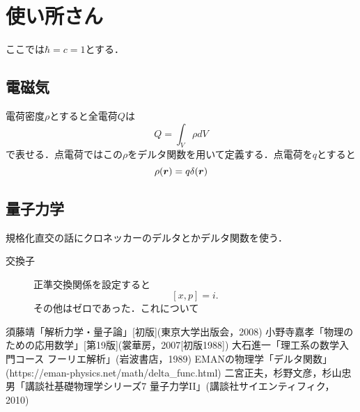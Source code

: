 \documentclass{jsarticle}
\def\vector#1{\mbox{\boldmath $#1$}}
\def\kkakko#1{\left[ #1 \right] }
\begin{document}
\section{使い所さん}
ここでは$\hbar=c=1$とする．
\subsection{電磁気}
電荷密度$\rho$とすると全電荷$Q$は
\begin{equation}
Q=\int_{V} \rho dV
\end{equation}
で表せる．点電荷ではこの$\rho$をデルタ関数を用いて定義する．点電荷を$q$とすると
\begin{equation}
\rho(\vector{r})=q\delta(\vector{r})
\end{equation}
\subsection{量子力学}
規格化直交の話にクロネッカーのデルタとかデルタ関数を使う．
\begin{description}
\item[交換子] 正準交換関係を設定すると
\begin{equation}
\kkakko{x,p}=i.
\end{equation}
その他はゼロであった．これについて
\end{description}
\begin{thebibliography}{99}
 須藤靖「解析力学・量子論」[初版](東京大学出版会，2008)
 小野寺嘉孝「物理のための応用数学」[第19版](裳華房，2007[初版1988])
 大石進一「理工系の数学入門コース フーリエ解析」(岩波書店，1989)
EMANの物理学「デルタ関数」(https://eman-physics.net/math/delta\_func.html)
 二宮正夫，杉野文彦，杉山忠男「講談社基礎物理学シリーズ7 量子力学II」(講談社サイエンティフィク，2010)
\end{thebibliography}
 
\end{document}
